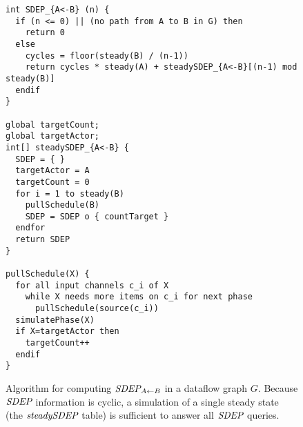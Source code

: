 

\begin{figure}[t]
{\scriptsize
\begin{verbatim}
int SDEP_{A<-B} (n) {
  if (n <= 0) || (no path from A to B in G) then
    return 0
  else
    cycles = floor(steady(B) / (n-1))
    return cycles * steady(A) + steadySDEP_{A<-B}[(n-1) mod steady(B)]
  endif
}

global targetCount;
global targetActor;
int[] steadySDEP_{A<-B} {
  SDEP = { }
  targetActor = A
  targetCount = 0
  for i = 1 to steady(B)
    pullSchedule(B)
    SDEP = SDEP o { countTarget }
  endfor
  return SDEP
}

pullSchedule(X) {
  for all input channels c_i of X
    while X needs more items on c_i for next phase
      pullSchedule(source(c_i))
  simulatePhase(X)
  if X=targetActor then
    targetCount++
  endif
}
\end{verbatim}}
\vspace{-12pt}
\caption{\small Algorithm for computing $\figsdepf{A}{B}$ in a
dataflow graph $G$.  Because $\mbox{\it SDEP}$ information is cyclic, a
simulation of a single steady state (the $\mbox{\it steadySDEP}$ table) is
sufficient to answer all $\mbox{\it SDEP}$
queries. \protect\label{fig:sdep1}}
\end{figure}



